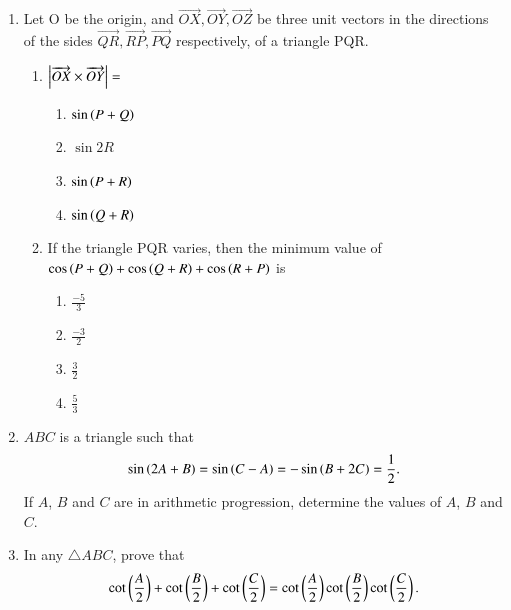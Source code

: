 \begin{enumerate}[label=\thesubsection.\arabic*,ref=\thesubsection.\theenumi]
\begin{multicols}{4}
\end{multicols}
\item
Let O be the origin, and $\overrightarrow{OX},\overrightarrow{OY},\overrightarrow{OZ}$ be three unit vectors in the directions of the sides $\overrightarrow{QR},\overrightarrow{RP},\overrightarrow{PQ}$ respectively, of a triangle PQR.\hfill{}
\begin{enumerate}
	\item $\left\vert\overrightarrow{OX}\times\overrightarrow{OY}\right\vert=$
	\begin{multicols}{4}
\begin{enumerate}
		\item$\sin\left(P+Q\right)$ 
		\item$\sin2R$
		\item$\sin\left(P+R\right)$
		\item$\sin\left(Q+R\right)$
	\end{enumerate}
\end{multicols}
%
	\item If the triangle PQR varies, then the minimum value of $\cos\left(P+Q\right)+\cos\left(Q+R\right)+\cos\left(R+P\right)$ is
	\begin{multicols}{4}
\begin{enumerate}
		\item$\frac{-5}{3}$
		\item$\frac{-3}{2}$
		\item$\frac{3}{2}$
		\item$\frac{5}{3}$
	\end{enumerate}
\end{multicols}
	\end{enumerate}
\item $ABC$ is a triangle such that 
\hfill{}
$$	\sin{\ensuremath{\left(2A+B\right)}}=\sin{\ensuremath{\left(C-A\right)}}=-\sin{\ensuremath{\left(B+2C\right)}}=\frac{1}{2}
.$$
If $A$, $B$ and $C$ are in arithmetic progression, determine the values of $A$, $B$ and $C$.
\item In any $\triangle ABC$, prove that 
\hfill{}
$$
\cot \left(\frac{A}{2}\right)+\cot \left(\frac{B}{2}\right)+\cot \left(\frac{C}{2}\right)=\cot \left(\frac{A}{2}\right)\cot \left(\frac{B}{2}\right)\cot \left(\frac{C}{2}\right).
$$
\end{enumerate}

